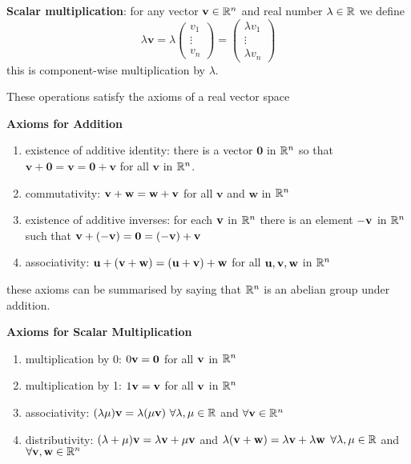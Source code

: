 \documentclass[10pt, a4paper]{article}
\begin{document}
\textbf{Scalar multiplication}: for any vector $\mathbf{v} \in \mathbb{R} ^ n$ and real number $\lambda \in \mathbb{R}$ we define
\[
\lambda\mathbf{v} =
\lambda\begin{pmatrix}
    v_1 \\
    \vdots \\
    v_n
\end{pmatrix}
=
\begin{pmatrix}
    \lambda v_1 \\
    \vdots \\
    \lambda v_n
\end{pmatrix}
\]
this is component-wise multiplication by $\lambda$.

\begin{proposition}
    These operations satisfy the axioms of a real vector space
\end{proposition}

{\large \textbf{Axioms for Addition}}
\begin{enumerate}[label = (\roman*)]
    \item existence of additive identity: there is a vector $\mathbf{0}$ in $\mathbb{R} ^ n$ so that $\mathbf{v} + \mathbf{0} = \mathbf{v} = \mathbf{0} + \mathbf{v}$ for all $\mathbf{v}$ in $\mathbb{R} ^ n$.
    \item commutativity: $\mathbf{v + w = w + v}$ for all $\mathbf{v}$ and $\mathbf{w}$ in $\mathbb{R} ^ n$
    \item existence of additive inverses: for each $\mathbf{v}$ in $\mathbb{R} ^ n$ there is an element $-\mathbf{v}$ in $\mathbb{R} ^ n$ such that $\mathbf{v + (-v) = 0 = (-v) + v}$
    \item associativity: $\mathbf{u + (v + w) = (u + v) + w}$ for all $\mathbf{u, v, w}$ in $\mathbb{R} ^ n$
\end{enumerate}
these axioms can be summarised by saying that $\mathbb{R} ^ n$ is an abelian group under addition.


{\large\textbf{Axioms for Scalar Multiplication}}
\begin{enumerate}[label = (\roman*)]
    \item multiplication by 0: $0\mathbf{v = 0}$ for all $\mathbf{v}$ in $\mathbb{R} ^ n$
    \item multiplication by 1: $1\mathbf{v = v}$ for all $\mathbf{v}$ in $\mathbb{R} ^ n$
    \item associativity: $(\lambda\mu)\mathbf{v} = \lambda (\mu\mathbf{v})\ \forall \lambda, \mu \in \mathbb{R}$ and $\forall \mathbf{v} \in \mathbb{R} ^ n$
    \item distributivity: $(\lambda + \mu)\mathbf{v} = \lambda\mathbf{v} + \mu\mathbf{v}$ and $\lambda (\mathbf{v + w}) = \lambda\mathbf{v} + \lambda\mathbf{w}$ $\forall \lambda, \mu \in \mathbb{R}$ and $\forall \mathbf{v, w} \in \mathbb{R} ^ n$
\end{enumerate}
\end{document}
